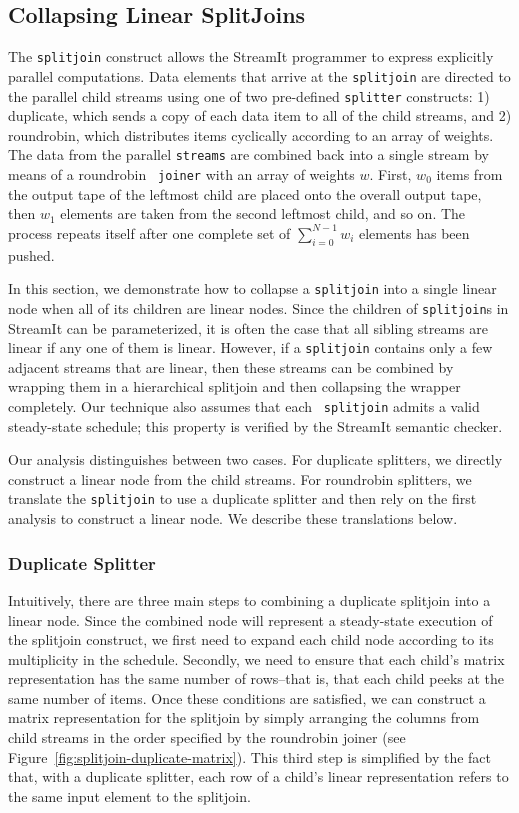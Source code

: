 \subsection{Collapsing Linear SplitJoins}

The {\tt splitjoin} construct allows the StreamIt programmer to
express explicitly parallel computations.  Data elements that arrive
at the {\tt splitjoin} are directed to the parallel child streams
using one of two pre-defined {\tt splitter} constructs: 1) duplicate,
which sends a copy of each data item to all of the child streams, and
2) roundrobin, which distributes items cyclically according to an
array of weights.  The data from the parallel {\tt streams} are
combined back into a single stream by means of a roundrobin {\tt
joiner} with an array of weights $w$.  First, $w_0$ items from the
output tape of the leftmost child are placed onto the overall output
tape, then $w_1$ elements are taken from the second leftmost child,
and so on.  The process repeats itself after one complete set of
$\sum_{i=0}^{N-1} w_i$ elements has been pushed.

In this section, we demonstrate how to collapse a {\tt splitjoin} into
a single linear node when all of its children are linear nodes.  Since
the children of {\tt splitjoin}s in StreamIt can be parameterized, it
is often the case that all sibling streams are linear if any one of
them is linear.  However, if a {\tt splitjoin} contains only a few
adjacent streams that are linear, then these streams can be combined
by wrapping them in a hierarchical splitjoin and then collapsing the
wrapper completely.  Our technique also assumes that each {\tt
splitjoin} admits a valid steady-state schedule; this property is
verified by the StreamIt semantic checker.

Our analysis distinguishes between two cases.  For duplicate
splitters, we directly construct a linear node from the child streams.
For roundrobin splitters, we translate the {\tt splitjoin} to use a
duplicate splitter and then rely on the first analysis to construct a
linear node.  We describe these translations below.

\subsubsection{Duplicate Splitter}

Intuitively, there are three main steps to combining a duplicate
splitjoin into a linear node.  Since the combined node will represent
a steady-state execution of the splitjoin construct, we first need to
expand each child node according to its multiplicity in the schedule.
Secondly, we need to ensure that each child's matrix representation
has the same number of rows--that is, that each child peeks at the
same number of items.  Once these conditions are satisfied, we can
construct a matrix representation for the splitjoin by simply
arranging the columns from child streams in the order specified by the
roundrobin joiner (see Figure~\ref{fig:splitjoin-duplicate-matrix}).
This third step is simplified by the fact that, with a duplicate
splitter, each row of a child's linear representation refers to the
same input element to the splitjoin.

